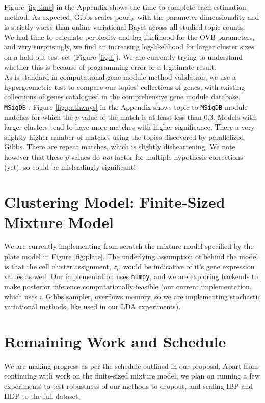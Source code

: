 \documentclass[11pt]{article}
\begin{document}
Figure \ref{fig:time} in the Appendix shows the time to complete each estimation method. As expected, Gibbs scales poorly with the parameter dimensionality and is strictly worse than online variational Bayes across all studied topic counts. \\

We had time to calculate perplexity and log-likelihood for the OVB parameters, and very surprisingly, we find an increasing log-likelihood for larger cluster sizes on a held-out test set (Figure \ref{fig:ll}). We are currently trying to understand whether this is because of programming error or a legitimate result. \\

As is standard in computational gene module method validation, we use a hypergeometric test to compare our topics' collections of genes, with existing collections of genes catalogued in the comprehensive gene module database, \texttt{MSigDB} \cite{msigdb}. Figure \ref{fig:pathways} in the Appendix shows topic-to-\texttt{MSigDB} module matches for which the $p$-value of the match is at least less than 0.3. Models with larger clusters tend to have more matches with higher significance. There
a very slightly higher number of matches using the topics discovered by parallelized Gibbs. There are repeat matches, which is slightly disheartening. We note however that these $p$-values do \textit{not} factor for multiple hypothesis corrections (yet), so could be misleadingly significant!

\section{Clustering Model: Finite-Sized Mixture Model}

We are currently implementing from scratch the mixture model specified by the plate model in Figure \ref{fig:plate}. The underlying assumption of behind the model is that the cell cluster assignment, $z_i$, would be indicative of it's gene expression values as well. Our implementation uses \texttt{numpy}, and we are exploring backends to make posterior inference computationally feasible (our current implementation, which uses a Gibbs sampler, overflows memory, so we are 
implementing stochastic variational methods, like used in our LDA experiments).

\section{Remaining Work and Schedule}
We are making progress as per the schedule outlined in our proposal. Apart from continuing with work on the finite-sized mixture model, we plan on running a few experiments to test robustness of our methods to dropout, and scaling IBP and HDP to the full dataset.
\end{document}

